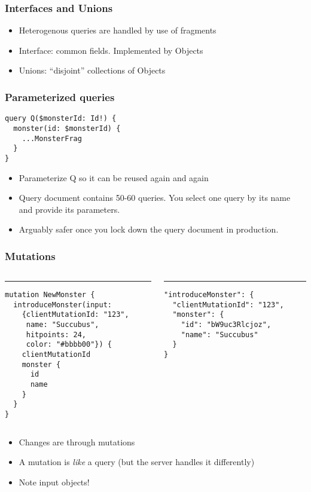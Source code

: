 \documentclass[lualatex]{beamer}
\begin{document}
\begin{frame}
  \frametitle{Interfaces and Unions}
  \begin{itemize}
  \item Heterogenous queries are handled by use of fragments
  \item Interface: common fields. Implemented by Objects
  \item Unions: ``disjoint'' collections of Objects
  \end{itemize}
\end{frame}
\begin{frame}[fragile]
  \frametitle{Parameterized queries}
\begin{verbatim}
query Q($monsterId: Id!) {
  monster(id: $monsterId) {
    ...MonsterFrag
  }
}
\end{verbatim}
\begin{itemize}
\item Parameterize Q so it can be reused again and again
\item Query document contains 50-60 queries. You select one query by
  its name and provide its parameters.
\item Arguably safer once you lock down the query document in production.
\end{itemize}
\end{frame}

\begin{frame}[fragile]
  \frametitle{Mutations}
\begin{columns}[T] %
\begin{column}{.5\textwidth}
\color{black}\rule{\linewidth}{1pt}
\begin{verbatim}
mutation NewMonster {
  introduceMonster(input:
    {clientMutationId: "123",
     name: "Succubus",
     hitpoints: 24,
     color: "#bbbb00"}) {
    clientMutationId
    monster {
      id
      name
    }
  }
}
\end{verbatim}
\end{column}
\hfill
\begin{column}{.5\textwidth}
\color{gray}\rule{\linewidth}{1pt}
\begin{verbatim}
"introduceMonster": {
  "clientMutationId": "123",
  "monster": {
    "id": "bW9uc3Rlcjoz",
    "name": "Succubus"
  }
}
\end{verbatim}
\end{column}
\end{columns}
\begin{itemize}
\item Changes are through mutations
\item A mutation is \emph{like} a query (but the server handles it differently)
\item Note input objects!
\end{itemize}
\end{frame}
\end{document}
